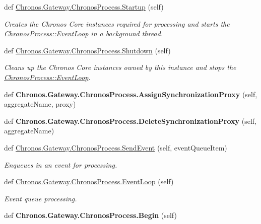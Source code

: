 \begin{DoxyCompactItemize}
\item 
def \hyperlink{group__Chronos_gae5027792d4f78b27d2b2eed69eeae697}{Chronos.\+Gateway.\+Chronos\+Process.\+Startup} (self)
\begin{DoxyCompactList}\small\item\em Creates the Chronos Core instances required for processing and starts the \hyperlink{group__Chronos_gaefd9a9f928112951d36eb314ec1d1ef2}{Chronos\+Process\+::\+Event\+Loop} in a background thread. \end{DoxyCompactList}\item 
def \hyperlink{group__Chronos_gaf7218fb21583767ca7bda97becef62fd}{Chronos.\+Gateway.\+Chronos\+Process.\+Shutdown} (self)
\begin{DoxyCompactList}\small\item\em Cleans up the Chronos Core instances owned by this instance and stops the \hyperlink{group__Chronos_gaefd9a9f928112951d36eb314ec1d1ef2}{Chronos\+Process\+::\+Event\+Loop}. \end{DoxyCompactList}\item 
def {\bfseries Chronos.\+Gateway.\+Chronos\+Process.\+Assign\+Synchronization\+Proxy} (self, aggregate\+Name, proxy)\hypertarget{group__Chronos_ga27f0eb150ad6f9b08e418cd5d65c7623}{}\label{group__Chronos_ga27f0eb150ad6f9b08e418cd5d65c7623}

\item 
def {\bfseries Chronos.\+Gateway.\+Chronos\+Process.\+Delete\+Synchronization\+Proxy} (self, aggregate\+Name)\hypertarget{group__Chronos_ga5724ac64d10fd58cb67f051af9cef9c6}{}\label{group__Chronos_ga5724ac64d10fd58cb67f051af9cef9c6}

\item 
def \hyperlink{group__Chronos_ga8b8d1338ffabd17cbf64eac8998b8f4b}{Chronos.\+Gateway.\+Chronos\+Process.\+Send\+Event} (self, event\+Queue\+Item)
\begin{DoxyCompactList}\small\item\em Enqueues in an event for processing. \end{DoxyCompactList}\item 
def \hyperlink{group__Chronos_gaefd9a9f928112951d36eb314ec1d1ef2}{Chronos.\+Gateway.\+Chronos\+Process.\+Event\+Loop} (self)
\begin{DoxyCompactList}\small\item\em Event queue processing. \end{DoxyCompactList}\item 
def {\bfseries Chronos.\+Gateway.\+Chronos\+Process.\+Begin} (self)\hypertarget{group__Chronos_gad8e2f4246b8b7f1fb6b0e184ea643ba6}{}\label{group__Chronos_gad8e2f4246b8b7f1fb6b0e184ea643ba6}


\end{DoxyCompactItemize}
